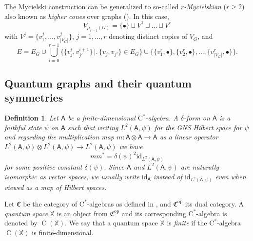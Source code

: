 \documentclass[11pt,reqno]{amsart}
\newtheorem{definition}[proposition]{Definition}
\newcommand{\cst}{\ensuremath{\mathrm{C}^*}}
\newcommand{\id}{\mathrm{id}}
\newcommand{\tens}{\otimes}
\DeclareMathOperator{\C}{C}
\begin{document}
The Mycielski construction can be generalized to so-called \emph{$r$-Mycielskian} ($r\geq 2$) also known as \emph{higher cones} over graphs (\cite{Stiebitz, VanNgoc}). In this case, 
\[
V_{\mu_{r-1}(G)}=\{\bullet\}\sqcup V^1\sqcup\ldots\sqcup V^r
\]
with $V^j=\{v_1^j,\ldots,v^j_{|V_G|}\}$, $j=1,\ldots,r$ denoting distinct copies of $V_G$, and
\[
E = E_G\cup\bigcup_{i=0}^{r-1}\bigl\{\{v^i_j,v^{i+1}_{j'}\}\,\bigr|\bigl.\,\{v_j,v_{j'}\}\in E_G\bigr\}\cup\bigl\{\{v^r_1,\bullet\},\{v^r_2,\bullet\},\ldots,\{v^r_{|V_G|},\bullet\}\bigr\}.
\]

\subsection{Quantum graphs and their quantum symmetries}\label{subsec:qgqg}\hspace*{\fill}

\begin{definition}
Let $\mathsf{A}$ be a finite-dimensional \cst-algebra. A \emph{$\delta$-form} on $\mathsf{A}$ is a faithful state $\psi$ on $\mathsf{A}$ such that writing $L^2(\mathsf{A},\psi)$ for the GNS Hilbert space for $\psi$ and regarding the multiplication map $m\colon\mathsf{A}\tens\mathsf{A}\to\mathsf{A}$ as a linear operator $L^2(\mathsf{A},\psi)\tens L^2(\mathsf{A},\psi)\to L^2(\mathsf{A},\psi)$ we have
\[
mm^*=\delta(\psi)^2\id_{L^2(\mathsf{A},\psi)}
\]
for some positive constant $\delta(\psi)$. Since $\mathsf{A}$ and $L^2(\mathsf{A},\psi)$ are naturally isomorphic as vector spaces, we usually write $\id_{\mathsf{A}}$ instead of $\id_{L^2(\mathsf{A},\psi)}$ even when viewed as a map of Hilbert spaces.
\end{definition}

Let $\mathfrak{C}$ be the category of $\cst$-algebras as defined in \cite{Woronowicz79,Woronowicz95}, and $\mathfrak{C}^{\mathrm{op}}$ its dual category. A \emph{quantum space} $\mathbb{X}$ is an object from $\mathfrak{C}^{\mathrm{op}}$ and its corresponding $\cst$-algebra is denoted by $\C(\mathbb{X})$. We say that a quantum space $\mathbb{X}$ is \emph{finite} if the \cst-algebra $\C(\mathbb{X})$ is finite-dimensional.
\end{document}
